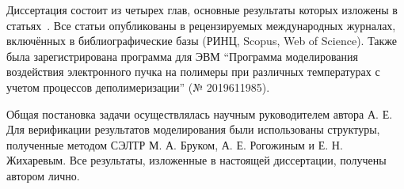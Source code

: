 Диссертация состоит из четырех глав, основные результаты которых изложены в статьях~\cite{my_CO, my_microlenses, my_evidence, my_detailed, my_review_RU, my_MEE, my_Gvalue, my_microscopic, my_Isaev_RU}. Все статьи опубликованы в рецензируемых международных журналах, включённых в библиографические базы (РИНЦ, Scopus, Web of Science). Также была зарегистрирована программа для ЭВМ ``Программа моделирования воздействия электронного пучка на полимеры при различных температурах с учетом процессов деполимеризации'' (№ 2019611985).


\contribution

Общая постановка задачи осуществлялась научным руководителем автора  А. Е. Для верификации результатов моделирования были использованы структуры, полученные методом СЭЛТР М. А. Бруком, А. Е. Рогожиным и Е. Н. Жихаревым. Все результаты, изложенные в настоящей диссертации, получены автором лично.

